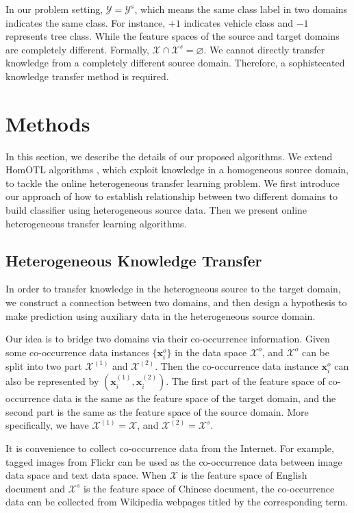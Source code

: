 \documentclass{article} %
\theoremstyle{remark}
\theoremstyle{definition}
\begin{document}
In our problem setting, $\mathcal{Y} = \mathcal{Y}^{s}$, which means the same class label in two domains indicates the same class.
For instance, $+1$ indicates vehicle class and $-1$ represents tree class.
While the feature spaces of the source and target domains are completely different.
Formally, $\mathcal{X} \cap \mathcal{X}^{s} = \varnothing$.
We cannot directly transfer knowledge from a completely different source domain.
Therefore, a sophistecated knowledge transfer method is required.

\section{Methods}

In this section, we describe the details of our proposed algorithms.
We extend HomOTL algorithms \cite{zhao2014online}, which exploit knowledge in a homogeneous source domain, to tackle the online heterogeneous transfer learning problem.
We first introduce our approach of how to establish relationship between two different domains to build classifier using heterogeneous source data.
Then we present online heterogeneous transfer learning algorithms.

\subsection{Heterogeneous Knowledge Transfer}

In order to transfer knowledge in the heterogneous source to the target domain, we construct a connection between two domains, and then design a hypothesis to make prediction using auxiliary data in the heterogeneous source domain.

Our idea is to bridge two domains via their co-occurrence information.
Given some co-occurrence data instances $\{ \mathbf{x}_{i}^{o} \}$ in the data space $\mathcal{X}^o$, and $\mathcal{X}^o$ can be split into two part $\mathcal{X}^{(1)}$ and $\mathcal{X}^{(2)}$.
Then the co-occurrence data instance $\mathbf{x}_{i}^{o}$ can also be represented by $(\mathbf{x}_{i}^{(1)}, \mathbf{x}_{i}^{(2)})$.
The first part of the feature space of co-occurrence data is the same as the feature space of the target domain, and the second part is the same as the feature space of the source domain.
More specifically, we have $\mathcal{X}^{(1)} = \mathcal{X}$, and $\mathcal{X}^{(2)} = \mathcal{X}^s$.

It is convenience to collect co-occurrence data from the Internet.
For example, tagged images from Flickr can be used as the co-occurrence data between image data space and text data space.
When $\mathcal{X}$ is the feature space of English document and $\mathcal{X}^s$ is the feature space of Chinese document, the co-occurrence data can be collected from Wikipedia webpages titled by the corresponding term.
\end{document}
